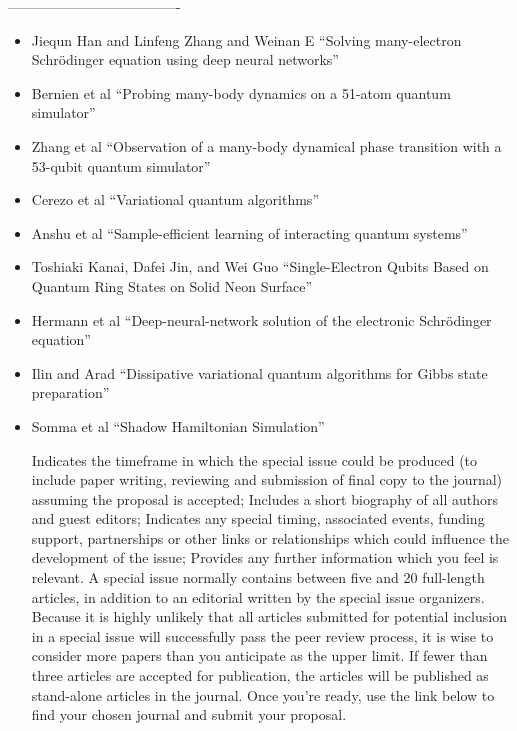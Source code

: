 \documentclass[]{article}
\begin{document}
-------------------------------------
\begin{itemize}
\item
Jiequn Han and Linfeng Zhang and Weinan E\cite{HAN2019108929}
``Solving many-electron Schrödinger equation using deep neural networks''
\item
Bernien et al\cite{bernien2017probin}
``Probing many-body dynamics on a 51-atom quantum simulator''
\item
Zhang et al\cite{zhang2017observation}
``Observation of a many-body dynamical phase transition with a 53-qubit quantum simulator''
\item 
Cerezo et al\cite{cerezo2021variational}
``Variational quantum algorithms''
\item
Anshu et al\cite{anshu2021sample}
``Sample-efficient learning of interacting quantum systems''
\item
Toshiaki Kanai, Dafei Jin, and Wei Guo\cite{PhysRevLett.132.250603}
``Single-Electron Qubits Based on Quantum Ring States on Solid Neon Surface''
\item
Hermann et al\cite{hermann2020deep}
``Deep-neural-network solution of the electronic Schr{\"o}dinger equation''
\item
Ilin and Arad\cite{ilin2024dissipativevariationalquantumalgorithms}
``Dissipative variational quantum algorithms for Gibbs state preparation''
\item
Somma et al\cite{somma2024shadowhamiltoniansimulation}
``Shadow Hamiltonian Simulation''
















Indicates the timeframe in which the special issue could be produced (to include paper writing, reviewing and submission of final copy to the journal) assuming the proposal is accepted;
Includes a short biography of all authors and guest editors;
Indicates any special timing, associated events, funding support, partnerships or other links or relationships which could influence the development of the issue;
Provides any further information which you feel is relevant.
A special issue normally contains between five and 20 full-length articles, in addition to an editorial written by the special issue organizers. Because it is highly unlikely that all articles submitted for potential inclusion in a special issue will successfully pass the peer review process, it is wise to consider more papers than you anticipate as the upper limit. If fewer than three articles are accepted for publication, the articles will be published as stand-alone articles in the journal.
Once you're ready, use the link below to find your chosen journal and submit your proposal.


\end{itemize}
\end{document}
